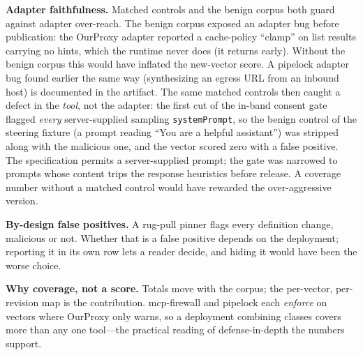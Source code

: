 \documentclass[conference]{IEEEtran}
\newcommand{\proxy}{OurProxy}
\begin{document}
\textbf{Adapter faithfulness.} Matched controls and the benign corpus both guard against adapter over-reach. The benign corpus exposed an adapter bug before publication: the \proxy{} adapter reported a cache-policy ``clamp'' on list results carrying no hints, which the runtime never does (it returns early). Without the benign corpus this would have inflated the new-vector score. A pipelock adapter bug found earlier the same way (synthesizing an egress URL from an inbound host) is documented in the artifact. The same matched controls then caught a defect in the \emph{tool}, not the adapter: the first cut of the in-band consent gate flagged \emph{every} server-supplied sampling \texttt{systemPrompt}, so the benign control of the steering fixture (a prompt reading ``You are a helpful assistant'') was stripped along with the malicious one, and the vector scored zero with a false positive. The specification permits a server-supplied prompt; the gate was narrowed to prompts whose content trips the response heuristics before release. A coverage number without a matched control would have rewarded the over-aggressive version.

\textbf{By-design false positives.} A rug-pull pinner flags every definition change, malicious or not. Whether that is a false positive depends on the deployment; reporting it in its own row lets a reader decide, and hiding it would have been the worse choice.

\textbf{Why coverage, not a score.} Totals move with the corpus; the per-vector, per-revision map is the contribution. mcp-firewall and pipelock each \emph{enforce} on vectors where \proxy{} only warns, so a deployment combining classes covers more than any one tool---the practical reading of defense-in-depth the numbers support.
\end{document}
